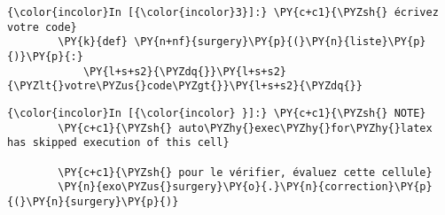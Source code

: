     \begin{Verbatim}[commandchars=\\\{\},frame=single,framerule=0.3mm,rulecolor=\color{cellframecolor}]
{\color{incolor}In [{\color{incolor}3}]:} \PY{c+c1}{\PYZsh{} écrivez votre code}
        \PY{k}{def} \PY{n+nf}{surgery}\PY{p}{(}\PY{n}{liste}\PY{p}{)}\PY{p}{:}
            \PY{l+s+s2}{\PYZdq{}}\PY{l+s+s2}{\PYZlt{}votre\PYZus{}code\PYZgt{}}\PY{l+s+s2}{\PYZdq{}}
\end{Verbatim}


    \begin{Verbatim}[commandchars=\\\{\},frame=single,framerule=0.3mm,rulecolor=\color{cellframecolor}]
{\color{incolor}In [{\color{incolor} }]:} \PY{c+c1}{\PYZsh{} NOTE}
        \PY{c+c1}{\PYZsh{} auto\PYZhy{}exec\PYZhy{}for\PYZhy{}latex has skipped execution of this cell}
        
        \PY{c+c1}{\PYZsh{} pour le vérifier, évaluez cette cellule}
        \PY{n}{exo\PYZus{}surgery}\PY{o}{.}\PY{n}{correction}\PY{p}{(}\PY{n}{surgery}\PY{p}{)}
\end{Verbatim}



    
    
    
